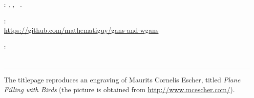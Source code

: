 \thispagestyle{empty}

\hfill

\vfill

\noindent\myName:
\textit{\myTitle,} \mySubTitle,
\textcopyright\ \myTime.

\medskip
{}: \\
\url{https://github.com/mathematiguy/gans-and-wgans}

\medskip
{}: \\
 \\

\vspace{1cm}
\hrule
\bigskip

\noindent The titlepage reproduces an engraving of Maurits Cornelis Escher, titled \emph{Plane Filling with Birds} (the picture is obtained from \url{http://www.mcescher.com/}).